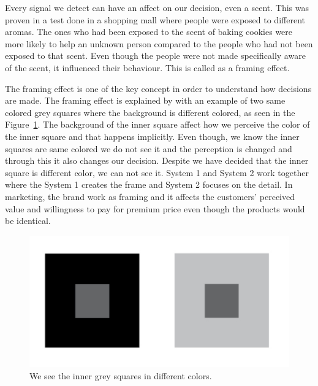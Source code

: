 Every signal we detect can have an affect on our decision, even a scent. This was proven in a test done in a shopping mall where people were exposed to different aromas. The ones who had been exposed to the scent of baking cookies were more likely to help an unknown person compared to the people who had not been exposed to that scent. Even though the people were not made specifically aware of the scent, it influenced their behaviour. This is called as a framing effect. \parencite{Decoded:2013}

The framing effect is one of the key concept in order to understand how decisions are made. The framing effect is explained by \textcite{Decoded:2013} with an example of two same colored grey squares where the background is different colored, as seen in the Figure~\ref{fig:squares}. The background of the inner square affect how we perceive the color of the inner square and that happens implicitly. Even though, we know the inner squares are same colored we do not see it and the perception is changed and through this it also changes our decision. Despite we have decided that the inner square is different color, we can not see it. System 1 and System 2 work together where the System 1 creates the frame and System 2 focuses on the detail. In marketing, the brand work as framing and it affects the customers' perceived value and willingness to pay for premium price even though the products would be identical.

\begin{figure}[ht]
  \begin{center}
    \includegraphics[scale=2, width=\textwidth]{dippa/images/squares.png}
    \caption{We see the inner grey squares in different colors.}
    \label{fig:squares}
  \end{center}
\end{figure}

